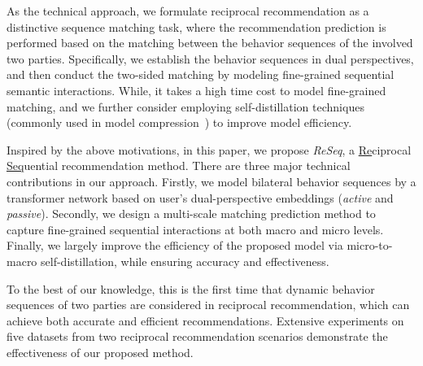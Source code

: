 As the technical approach, we formulate reciprocal recommendation as a distinctive sequence matching task, where the recommendation prediction is performed based on the matching between the behavior sequences of the involved two parties. 
Specifically, we establish the behavior sequences in dual perspectives, 
and then conduct the two-sided matching  by modeling fine-grained sequential semantic interactions.
While, it takes a high time cost to model fine-grained matching, and we further consider employing self-distillation techniques (commonly used in model compression~\cite{zhang2019your,xu2020improving,liu2020fastbert}) to improve model efficiency.  


Inspired by the above motivations, in this paper, we propose \emph{ReSeq}, a \underline{Re}ciprocal \underline{Seq}uential recommendation method.
There are three major technical contributions in our approach.
Firstly, we model bilateral behavior sequences by a transformer network\cite{vaswani2017attention} based on user's  dual-perspective embeddings (\ie \emph{active} and \emph{passive}).
 Secondly, we design a multi-scale matching prediction method to capture fine-grained sequential interactions at both macro and micro levels. 
Finally,  we largely improve the efficiency of the proposed model via micro-to-macro self-distillation,  while ensuring accuracy and effectiveness.

To the best of our knowledge, this is the first time that dynamic behavior sequences of two parties  are considered in reciprocal recommendation, which can achieve both accurate and efficient recommendations. Extensive experiments on five datasets from two reciprocal recommendation scenarios demonstrate the effectiveness of our proposed method.
















